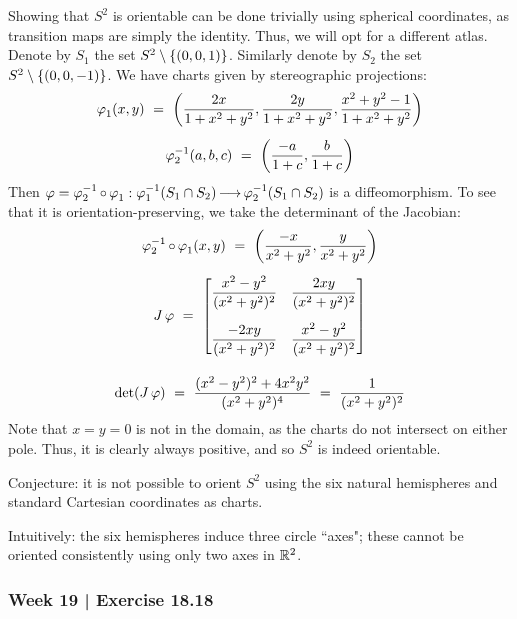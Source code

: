\begin{pf}
    Showing that $ S^{2} $ is orientable can be done trivially using spherical
    coordinates, as transition maps are simply the identity. Thus, we will opt
    for a different atlas. \vsp
    Denote by $ S_{1} $ the set $ S^{2} \setminus \left\{{(0, 0, 1)}\right\} $. Similarly
    denote by $ S_{2} $ the set $ S^{2} \setminus \left\{{(0, 0, -1)}\right\} $. We have
    charts given by stereographic projections:
    \begin{gather*}
        \vphi_{1}(x, y) \ = \ \left( \frac{2x}{1+x^{2}+y^{2}},
        \frac{2y}{1+x^{2}+y^{2}},\frac{x^{2}+y^{2}-1}{1+x^{2}+y^{2}}\right) \vsp
        \vphi_{2}^{-1}(a,b,c) \ = \ \left( \frac{-a}{1+c}, \frac{b}{1+c} \right)
    \end{gather*}
    Then $ \operatorname{\varphi} = \operatorname{\varphi}_{2}^{-1}\circ\operatorname{\varphi}_{1}:\operatorname{\varphi}_{1}^{-1}(S_{1}\cap S_{2})
    \operatorname{\longrightarrow} \operatorname{\varphi}_{2}^{-1}(S_{1}\cap S_{2}) $ is a diffeomorphism. To see that it
    is orientation-preserving, we take the determinant of the Jacobian:
    \begin{gather*}
        \vphi_{2}^{-1}\circ\vphi_{1}(x,y) \ = \
        \left(\frac{-x}{x^{2}+y^{2}}, \frac{y}{x^{2}+y^{2}}\right) \vsp
        J\vphi \ = \
        \begin{bmatrix}
            \dfrac{x^{2}-y^{2}}{(x^{2}+y^{2})^{2}} &
            \dfrac{2xy}{(x^{2}+y^{2})^{2}} \\[1.5em]
            \dfrac{-2xy}{(x^{2}+y^{2})^{2}} &
            \dfrac{x^{2}-y^{2}}{(x^{2}+y^{2})^{2}}
        \end{bmatrix} \\[1em]
        \det(J\vphi) \ = \ \frac{(x^{2}-y^{2})^{2}+4x^{2}y^{2}}
        {(x^{2}+y^{2})^{4}} \ = \ \frac{1}{(x^{2}+y^{2})^{2}}
    \end{gather*}
    Note that $ x = y = 0 $ is not in the domain, as the charts do not intersect
    on either pole. Thus, it is clearly always positive, and so $ S^{2} $ is
    indeed orientable.
\end{pf}
Conjecture: it is not possible to orient $ S^{2} $ using the six natural
hemispheres and standard Cartesian coordinates as charts.

Intuitively: the six hemispheres induce three circle ``axes"; these cannot be
oriented consistently using only two axes in $ \mathbb{R}^{2} $.

\newpage
\subsubsection{Week 19 | Exercise 18.18}

